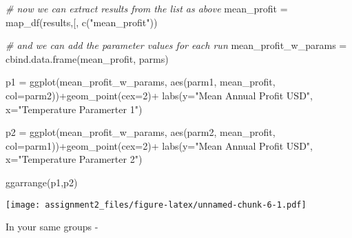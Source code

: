 \documentclass[
]{article}
\newenvironment{Shaded}{\begin{snugshade}}{\end{snugshade}}
\newcommand{\AttributeTok}[1]{\textcolor[rgb]{0.77,0.63,0.00}{#1}}
\newcommand{\CommentTok}[1]{\textcolor[rgb]{0.56,0.35,0.01}{\textit{#1}}}
\newcommand{\DecValTok}[1]{\textcolor[rgb]{0.00,0.00,0.81}{#1}}
\newcommand{\FunctionTok}[1]{\textcolor[rgb]{0.00,0.00,0.00}{#1}}
\newcommand{\NormalTok}[1]{#1}
\newcommand{\OtherTok}[1]{\textcolor[rgb]{0.56,0.35,0.01}{#1}}
\newcommand{\SpecialCharTok}[1]{\textcolor[rgb]{0.00,0.00,0.00}{#1}}
\newcommand{\StringTok}[1]{\textcolor[rgb]{0.31,0.60,0.02}{#1}}
\begin{document}
\begin{Shaded}
\begin{Highlighting}[]
\CommentTok{\# now we can extract results from the list as above}
\NormalTok{mean\_profit }\OtherTok{=} \FunctionTok{map\_df}\NormalTok{(results,}\StringTok{\textasciigrave{}}\AttributeTok{[}\StringTok{\textasciigrave{}}\NormalTok{, }\FunctionTok{c}\NormalTok{(}\StringTok{"mean\_profit"}\NormalTok{))}

\CommentTok{\# and we can add the parameter values for each run}
\NormalTok{mean\_profit\_w\_params }\OtherTok{=} \FunctionTok{cbind.data.frame}\NormalTok{(mean\_profit, parms)}
\end{Highlighting}
\end{Shaded}

\begin{Shaded}
\begin{Highlighting}[]
\NormalTok{p1 }\OtherTok{=} \FunctionTok{ggplot}\NormalTok{(mean\_profit\_w\_params, }
            \FunctionTok{aes}\NormalTok{(parm1, mean\_profit, }\AttributeTok{col=}\NormalTok{parm2))}\SpecialCharTok{+}\FunctionTok{geom\_point}\NormalTok{(}\AttributeTok{cex=}\DecValTok{2}\NormalTok{)}\SpecialCharTok{+}
  \FunctionTok{labs}\NormalTok{(}\AttributeTok{y=}\StringTok{"Mean Annual Profit USD"}\NormalTok{, }\AttributeTok{x=}\StringTok{"Temperature Paramerter 1"}\NormalTok{)}

\NormalTok{p2 }\OtherTok{=} \FunctionTok{ggplot}\NormalTok{(mean\_profit\_w\_params, }
            \FunctionTok{aes}\NormalTok{(parm2, mean\_profit, }\AttributeTok{col=}\NormalTok{parm1))}\SpecialCharTok{+}\FunctionTok{geom\_point}\NormalTok{(}\AttributeTok{cex=}\DecValTok{2}\NormalTok{)}\SpecialCharTok{+}
  \FunctionTok{labs}\NormalTok{(}\AttributeTok{y=}\StringTok{"Mean Annual Profit USD"}\NormalTok{, }\AttributeTok{x=}\StringTok{"Temperature Paramerter 2"}\NormalTok{)}

\FunctionTok{ggarrange}\NormalTok{(p1,p2)}
\end{Highlighting}
\end{Shaded}

\texttt{[image: assignment2\_files/figure-latex/unnamed-chunk-6-1.pdf]}

In your same groups -
\end{document}
